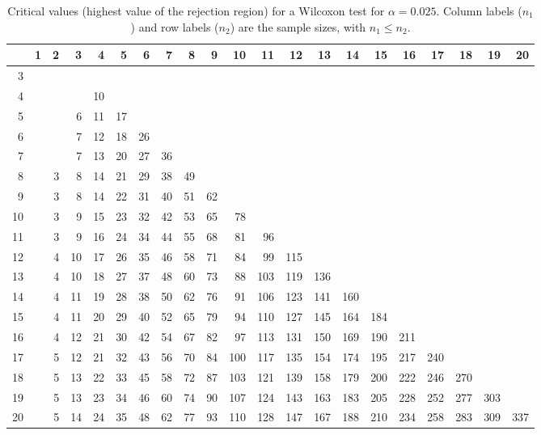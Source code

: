 \begin{table}[ht]
\centering
\begin{tabular}{rrrrrrrrrrrrrrrrrrrrr}
  \hline
 & 1 & 2 & 3 & 4 & 5 & 6 & 7 & 8 & 9 & 10 & 11 & 12 & 13 & 14 & 15 & 16 & 17 & 18 & 19 & 20 \\ 
  \hline
3 &  &  &  &  &  &  &  &  &  &  &  &  &  &  &  &  &  &  &  &  \\ 
  4 &  &  &  & 10 &  &  &  &  &  &  &  &  &  &  &  &  &  &  &  &  \\ 
  5 &  &  & 6 & 11 & 17 &  &  &  &  &  &  &  &  &  &  &  &  &  &  &  \\ 
  6 &  &  & 7 & 12 & 18 & 26 &  &  &  &  &  &  &  &  &  &  &  &  &  &  \\ 
  7 &  &  & 7 & 13 & 20 & 27 & 36 &  &  &  &  &  &  &  &  &  &  &  &  &  \\ 
  8 &  & 3 & 8 & 14 & 21 & 29 & 38 & 49 &  &  &  &  &  &  &  &  &  &  &  &  \\ 
  9 &  & 3 & 8 & 14 & 22 & 31 & 40 & 51 & 62 &  &  &  &  &  &  &  &  &  &  &  \\ 
  10 &  & 3 & 9 & 15 & 23 & 32 & 42 & 53 & 65 & 78 &  &  &  &  &  &  &  &  &  &  \\ 
  11 &  & 3 & 9 & 16 & 24 & 34 & 44 & 55 & 68 & 81 & 96 &  &  &  &  &  &  &  &  &  \\ 
  12 &  & 4 & 10 & 17 & 26 & 35 & 46 & 58 & 71 & 84 & 99 & 115 &  &  &  &  &  &  &  &  \\ 
  13 &  & 4 & 10 & 18 & 27 & 37 & 48 & 60 & 73 & 88 & 103 & 119 & 136 &  &  &  &  &  &  &  \\ 
  14 &  & 4 & 11 & 19 & 28 & 38 & 50 & 62 & 76 & 91 & 106 & 123 & 141 & 160 &  &  &  &  &  &  \\ 
  15 &  & 4 & 11 & 20 & 29 & 40 & 52 & 65 & 79 & 94 & 110 & 127 & 145 & 164 & 184 &  &  &  &  &  \\ 
  16 &  & 4 & 12 & 21 & 30 & 42 & 54 & 67 & 82 & 97 & 113 & 131 & 150 & 169 & 190 & 211 &  &  &  &  \\ 
  17 &  & 5 & 12 & 21 & 32 & 43 & 56 & 70 & 84 & 100 & 117 & 135 & 154 & 174 & 195 & 217 & 240 &  &  &  \\ 
  18 &  & 5 & 13 & 22 & 33 & 45 & 58 & 72 & 87 & 103 & 121 & 139 & 158 & 179 & 200 & 222 & 246 & 270 &  &  \\ 
  19 &  & 5 & 13 & 23 & 34 & 46 & 60 & 74 & 90 & 107 & 124 & 143 & 163 & 183 & 205 & 228 & 252 & 277 & 303 &  \\ 
  20 &  & 5 & 14 & 24 & 35 & 48 & 62 & 77 & 93 & 110 & 128 & 147 & 167 & 188 & 210 & 234 & 258 & 283 & 309 & 337 \\ 
   \hline
\end{tabular}
\caption{Critical values (highest value of the rejection region) for a Wilcoxon test for $\alpha=0.025$. Column labels ($n_1$) and row labels ($n_2$) are the sample sizes, with ${n_1}\leq{n_2}$.} 
\end{table}
